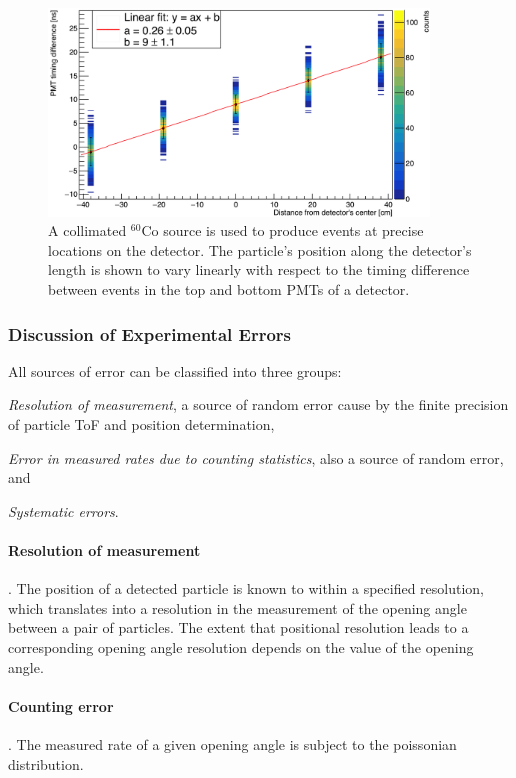 \begin{figure}
    \centering
    \includegraphics[width = 0.9\textwidth]{Content/Methods/PMTDifference.png}
    \caption{A collimated $^{60}$Co source is used to produce events at precise locations on the detector.
    The particle's position along the detector's length is shown to vary linearly with respect to the timing difference between events in the top and bottom PMTs of a detector.}
    \label{fig:PMTDifference}
\end{figure}
\subsubsection{Discussion of Experimental Errors}
\label{Errors}
All sources of error can be classified into three groups: \begin{enumerate*}[font={\color{red!50!black}\bfseries}]
\item \textit{Resolution of measurement}, a source of random error cause by the finite precision of particle ToF and position determination,
\item \textit{Error in measured rates due to counting statistics}, also a source of random error, and
\item \textit{Systematic errors}.
\end{enumerate*}

\paragraph{Resolution of measurement}.
The position of a detected particle is known to within a specified resolution, which translates into a resolution in the measurement of the opening angle between a pair of particles.
The extent that positional resolution leads to a corresponding opening angle resolution depends on the value of the opening angle.

\paragraph{Counting error}.
The measured rate of a given opening angle is subject to the poissonian distribution.

